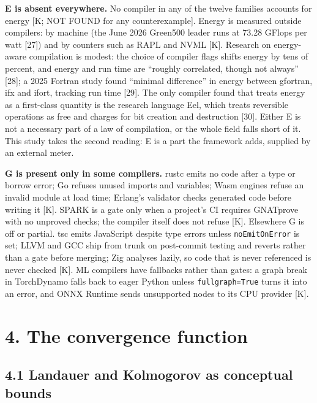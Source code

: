 \documentclass[10pt,letterpaper]{article}
\begin{document}
\textbf{E is absent everywhere.} No compiler in any of the twelve
families accounts for energy {[}K; NOT FOUND for any counterexample{]}.
Energy is measured outside compilers: by machine (the June 2026 Green500
leader runs at 73.28 GFlops per watt {[}27{]}) and by counters such as
RAPL and NVML {[}K{]}. Research on energy-aware compilation is modest:
the choice of compiler flags shifts energy by tens of percent, and
energy and run time are ``roughly correlated, though not always''
{[}28{]}; a 2025 Fortran study found ``minimal difference'' in energy
between gfortran, ifx and ifort, tracking run time {[}29{]}. The only
compiler found that treats energy as a first-class quantity is the
research language Eel, which treats reversible operations as free and
charges for bit creation and destruction {[}30{]}. Either E is not a
necessary part of a law of compilation, or the whole field falls short
of it. This study takes the second reading: E is a part the framework
adds, supplied by an external meter.

\textbf{G is present only in some compilers.} rustc emits no code after
a type or borrow error; Go refuses unused imports and variables; Wasm
engines refuse an invalid module at load time; Erlang's validator checks
generated code before writing it {[}K{]}. SPARK is a gate only when a
project's CI requires GNATprove with no unproved checks; the compiler
itself does not refuse {[}K{]}. Elsewhere G is off or partial. tsc emits
JavaScript despite type errors unless \texttt{noEmitOnError} is set;
LLVM and GCC ship from trunk on post-commit testing and reverts rather
than a gate before merging; Zig analyses lazily, so code that is never
referenced is never checked {[}K{]}. ML compilers have fallbacks rather
than gates: a graph break in TorchDynamo falls back to eager Python
unless \texttt{fullgraph=True} turns it into an error, and ONNX Runtime
sends unsupported nodes to its CPU provider {[}K{]}.

\section{4. The convergence function}\label{the-convergence-function}

\subsection{4.1 Landauer and Kolmogorov as conceptual
bounds}\label{landauer-and-kolmogorov-as-conceptual-bounds}
\end{document}
